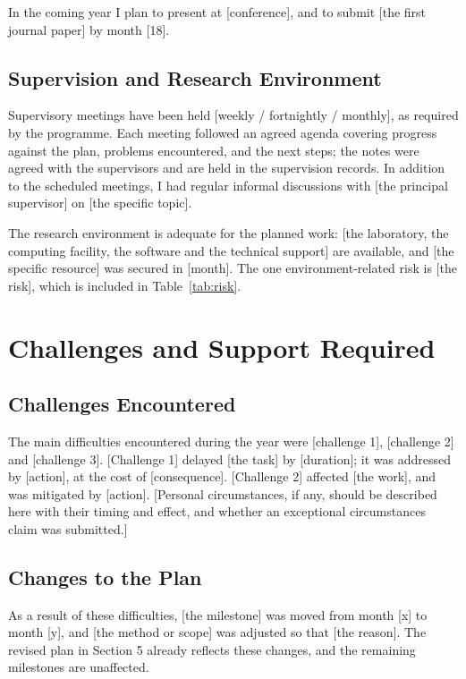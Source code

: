\documentclass{article}
\begin{document}
In the coming year I plan to present at [conference], and to submit [the first journal paper]
by month [18].

\subsection{Supervision and Research Environment}
Supervisory meetings have been held [weekly / fortnightly / monthly], as required by the
programme. Each meeting followed an agreed agenda covering progress against the plan, problems
encountered, and the next steps; the notes were agreed with the supervisors and are held in the
supervision records. In addition to the scheduled meetings, I had regular informal discussions
with [the principal supervisor] on [the specific topic].

The research environment is adequate for the planned work: [the laboratory, the computing
facility, the software and the technical support] are available, and [the specific resource] was
secured in [month]. The one environment-related risk is [the risk], which is included in
Table~\ref{tab:risk}.

\section{Challenges and Support Required}

\subsection{Challenges Encountered}
The main difficulties encountered during the year were [challenge 1], [challenge 2] and
[challenge 3]. [Challenge 1] delayed [the task] by [duration]; it was addressed by [action], at
the cost of [consequence]. [Challenge 2] affected [the work], and was mitigated by [action].
[Personal circumstances, if any, should be described here with their timing and effect, and
whether an exceptional circumstances claim was submitted.]

\subsection{Changes to the Plan}
As a result of these difficulties, [the milestone] was moved from month [x] to month [y], and
[the method or scope] was adjusted so that [the reason]. The revised plan in Section 5 already
reflects these changes, and the remaining milestones are unaffected.
\end{document}

